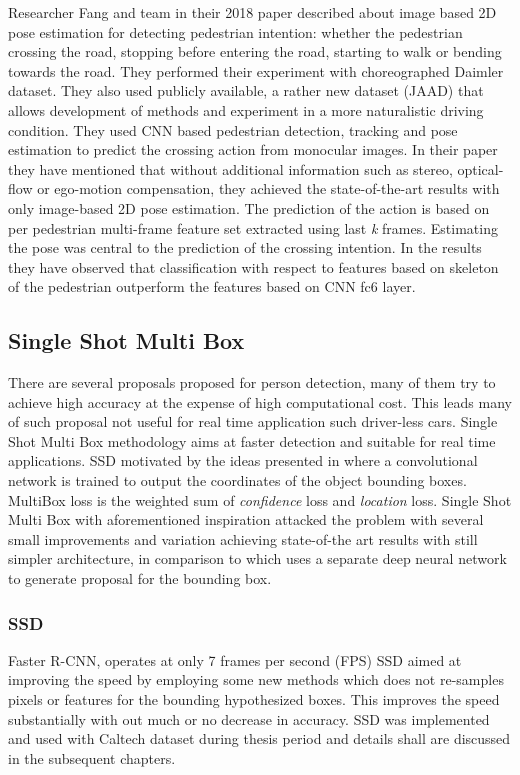 \newpara
Researcher Fang and team in their 2018 paper \cite{fang2018pedestrian} described about image based 2D pose estimation for detecting pedestrian intention: whether the pedestrian crossing the road, stopping before entering the road, starting to walk or bending towards the road. They performed their experiment with choreographed Daimler dataset. They also used publicly available, a rather new dataset (JAAD) \cite{kotseruba2016joint} that allows development of methods and experiment in a more naturalistic driving condition. They used CNN based pedestrian detection, tracking and pose estimation to predict the crossing action from monocular images. In their paper they have mentioned that without additional information such as stereo, optical-flow or ego-motion compensation, they achieved the state-of-the-art results with only image-based 2D pose estimation. The prediction of the action is based on per pedestrian multi-frame feature set extracted using last \textit{k} frames. Estimating the pose was central to the prediction of the crossing intention. In the results they have observed that classification with respect to features based on  skeleton of the pedestrian outperform the features based on CNN fc6 layer.

\subsection{Single Shot Multi Box}
There are several proposals proposed for person detection, many of them try to achieve high accuracy at the expense of high computational cost. This leads many of such proposal not useful for real time application such driver-less cars. Single Shot Multi Box methodology aims at faster detection and suitable for real time applications.  
SSD motivated by the ideas presented in \cite{szegedy2014scalable} where a convolutional network is trained to output the coordinates of the object bounding boxes. MultiBox loss is the weighted sum of \textit{confidence} loss and \textit{location} loss. Single Shot Multi Box with aforementioned inspiration attacked the problem with several small improvements and variation achieving state-of-the art results with still simpler architecture, in comparison to \cite{szegedy2014scalable} which uses a separate deep neural network to generate proposal for the bounding box.
\subsubsection{SSD}
Faster R-CNN, operates at only 7 frames per second (FPS) SSD aimed at improving the speed by employing some new methods which does not re-samples pixels or features for the bounding hypothesized boxes. This improves the speed substantially with out much or no decrease in accuracy. SSD was implemented and used with Caltech dataset \cite{dollar2009pedestrian} during thesis period and details shall are discussed in the subsequent chapters.

